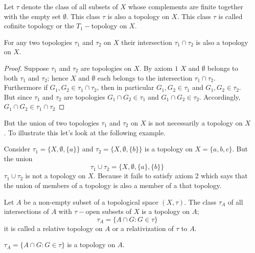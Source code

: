 \begin{example}\label{example4}
Let $\tau $ denote the class of all subsets of $X$ whose complements are finite together with the empty set $\emptyset$. This class $\tau $ is also a topology on $X$. This class $\tau$ is called cofinite topology or the $T_1-$topology on $X$.
\end{example}

\begin{proposition}
For any two topologies $\tau_1$ and $\tau_2$ on $X$ their intersection $\tau_1\cap \tau_2$ is also a topology on $X$.
\end{proposition}

\begin{proof}
Suppose $\tau_1$ and $\tau_2$ are topologies on $X$. By axiom $1$ $X$ and $\emptyset$ belongs to both $\tau_1$ and $\tau_2$; hence $X$ and $\emptyset$ each belongs to the intersection $\tau_1\cap\tau_2$. Furthermore if $G_1,G_2\in \tau_1\cap\tau_2$, then in particular $G_1,G_2\in \tau_1$ and $G_1,G_2\in \tau_2$. But since $\tau_1$ and $\tau_2$ are topologies $G_1\cap G_2\in \tau_1$ and $G_1\cap G_2\in \tau_2$. Accordingly, $G_1\cap G_2\in \tau_1\cap\tau_2$
\end{proof}

But the union of two topologies $\tau_1$ and $\tau_2$ on $X$ is not necessarily a topology on $X$.
To illustrate this let's look at the following example.
\begin{example}
Consider $\tau_1=\{X,\emptyset,\{a\}\}$ and $\tau_2=\{X,\emptyset,\{b\}\}$ is a topology on $X=\{a,b,c\}$. But the union $$ \tau_1\cup\tau_2=\{X,\emptyset,\{a\},\{b\}\} $$
$\tau_1 \cup \tau_2$ is not a topology on $X$. Because it fails to satisfy axiom 2 which says that the union of members of a topology is also a member of a that topology.
\end{example}

Let $A$ be a non-empty subset of a topological space $(X,\tau)$. The class $\tau_A$ of all intersections of $A$ with $\tau-$open subsets of $X$ is a topology on $A;$
$$\tau_A=\{A\cap G:G\in \tau\}$$
it is called a relative topology on $A$ or a relativization of $\tau$ to $A$.
\begin{proposition}
$\tau_A=\{A\cap G:G\in \tau\}$ is a topology on $A$.
\end{proposition}

